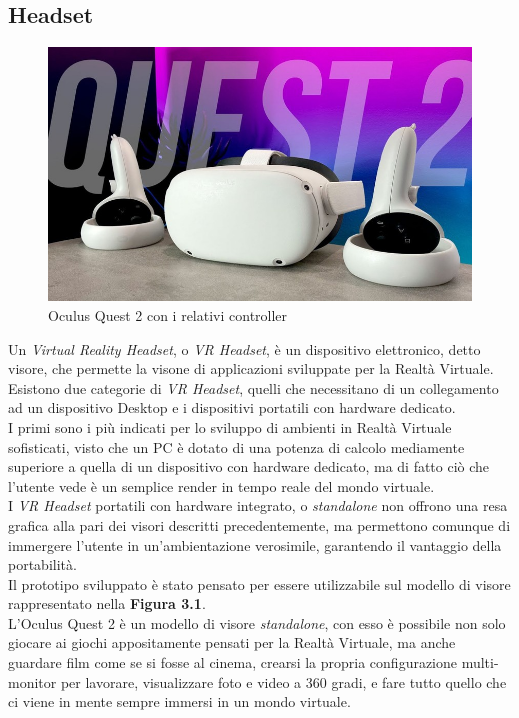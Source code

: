 \subsection{Headset}
\begin{figure}[H]
    \centering
    \includegraphics[scale = 0.5]{Immagini/Oculus-Quest-2.jpg}
    \caption{Oculus Quest 2 con i relativi controller}
    \label{fig:my_label}
\end{figure}
Un \textit{Virtual Reality Headset}\cite{Vrheadset}, o \textit{VR Headset}, è un dispositivo elettronico, detto visore, che permette la visone di applicazioni sviluppate per la Realtà Virtuale.\\Esistono due categorie di \textit{VR Headset}, quelli che necessitano di un collegamento ad un dispositivo Desktop e i dispositivi portatili con hardware dedicato.\\I primi sono i più indicati per lo sviluppo di ambienti in Realtà Virtuale sofisticati, visto che un PC è dotato di una potenza di calcolo mediamente superiore a quella di un dispositivo con hardware dedicato, ma di fatto ciò che l'utente vede è un semplice \gls{render} in tempo reale del mondo virtuale.\\I \textit{VR Headset} portatili con hardware integrato, o \textit{standalone} non offrono una resa grafica alla pari dei visori descritti precedentemente, ma permettono comunque di immergere l'utente in un'ambientazione verosimile, garantendo il vantaggio della portabilità.
\\Il prototipo sviluppato è stato pensato per essere utilizzabile sul modello di visore rappresentato nella \textbf{Figura 3.1}.
\\L'Oculus Quest 2 è un modello di visore \textit{standalone}, con esso è possibile non solo giocare ai giochi appositamente pensati per la Realtà Virtuale, ma anche guardare film come se si fosse al cinema, crearsi la propria configurazione multi-monitor per lavorare, visualizzare foto e video a 360 gradi, e fare tutto quello che ci viene in mente sempre immersi in un mondo virtuale.
